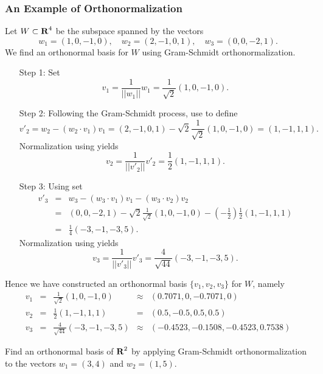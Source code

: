 \subsubsection*{An Example of Orthonormalization}

Let $W\subset\mbox{$\bf{R}$}^4$ be the subspace spanned by the vectors
\begin{equation}  \label{eq:gsexam}
w_1=(1,0,-1,0),\quad w_2=(2,-1,0,1),\quad w_3=(0,0,-2,1).
\end{equation}
We find an orthonormal basis for $W$ using Gram-Schmidt orthonormalization.

\begin{itemize}
\item[Step 1:]   Set
\[
v_1 = \frac{1}{||w_1||}w_1=\frac{1}{\sqrt{2}}(1,0,-1,0).
\]
\item[Step 2:] Following the Gram-Schmidt process, use  to
define
\[
v'_2 = w_2-(w_2\cdot v_1)v_1= (2,-1,0,1)-\sqrt{2}\frac{1}{\sqrt{2}}(1,0,-1,0)
=(1,-1,1,1).
\]
Normalization using  yields
\[
v_2 = \frac{1}{||v'_2||}v'_2 = \frac{1}{2}(1,-1,1,1).
\]
\item[Step 3:] Using  set
\begin{eqnarray*}
v'_3 &=& w_3-(w_3\cdot v_1)v_1-(w_3\cdot v_2)v_2\\
&=&(0,0,-2,1) - \sqrt{2}\frac{1}{\sqrt{2}}(1,0,-1,0)
-\left(-\frac{1}{2}\right)\frac{1}{2}(1,-1,1,1)\\
&=&\frac{1}{4}(-3,-1,-3,5).
\end{eqnarray*}
Normalization using  yields
\[
v_3 = \frac{1}{||v'_3||}v'_3 = \frac{4}{\sqrt{44}}(-3,-1,-3,5).
\]
\end{itemize}

Hence we have constructed an orthonormal basis $\{v_1,v_2,v_3\}$ for $W$,
namely
\begin{equation}
\label{eq:gsoresult}
\begin{array}{rcccl}
v_1 & = & \frac{1}{\sqrt{2}}(1,0,-1,0) & \approx & (0.7071,0,-0.7071,0)\\
v_2 & = & \frac{1}{2}(1,-1,1,1) & = & (0.5,-0.5,0.5,0.5)\\
v_3 & = & \frac{4}{\sqrt{44}}(-3,-1,-3,5) & \approx &
(-0.4523,-0.1508,-0.4523,0.7538)
\end{array}
\end{equation}


\EXER

\TEXER

\begin{exercise} \label{c7.5.1}
Find an orthonormal basis of $\mbox{$\bf{R}$}^2$ by applying Gram-Schmidt
orthonormalization to the vectors $w_1=(3,4)$ and $w_2=(1,5)$.
\end{exercise}

